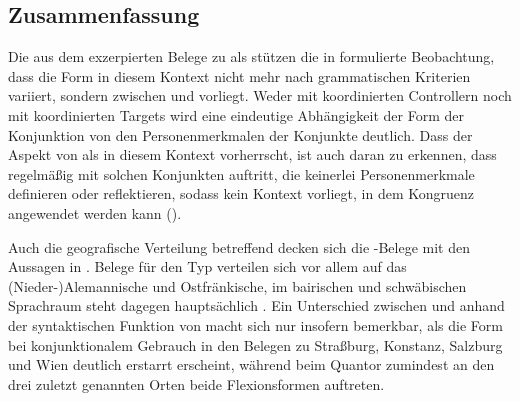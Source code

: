 
\subsection{Zusammenfassung}

Die aus dem \CAO{} exzerpierten Belege zu  als 
stützen die in \citet[626--627]{ksw2} formulierte
Beobachtung, dass die Form in diesem Kontext nicht mehr nach grammatischen
Kriterien variiert, sondern  zwischen  und
 vorliegt. Weder mit koordinierten Controllern noch
mit koordinierten Targets wird eine eindeutige
Abhängigkeit der Form der Konjunktion von den
Personenmerkmalen der Konjunkte deutlich. Dass der Aspekt
von  als  \autocites(siehe auch
)[425--428]{johannessen2005} in diesem Kontext
vorherrscht, ist auch daran zu erkennen, dass  regelmäßig mit
solchen Konjunkten auftritt, die keinerlei Personenmerkmale definieren oder
reflektieren, sodass kein Kontext vorliegt, in dem Kongruenz angewendet werden
kann ().

Auch die geografische Verteilung betreffend
decken sich die \CAO{}-Belege mit den Aussagen in
\citet[627--628]{ksw2}. Belege für den Typ  verteilen sich vor
allem auf das \mbox{(Nieder-)}\allowbreak{}Alemannische und
Ostfränkische, im bairischen und
schwäbischen Sprachraum steht dagegen
hauptsächlich . Ein Unterschied zwischen  und 
anhand der syntaktischen Funktion von  macht sich nur insofern
bemerkbar, als die Form bei konjunktionalem Gebrauch in den
Belegen zu Straßburg, Konstanz, Salzburg und Wien deutlich erstarrt erscheint,
während beim Quantor zumindest an den drei zuletzt genannten Orten beide
Flexionsformen auftreten.
